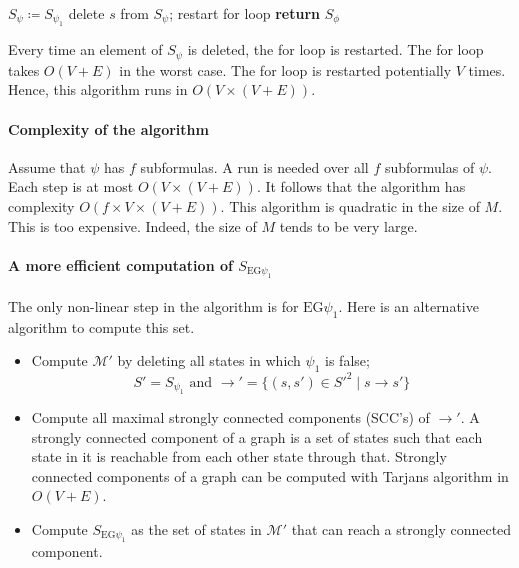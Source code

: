 \documentclass[10pt,a4paper]{article}
\theoremstyle{definition}
\begin{document}
\begin{itemize}
\begin{algorithm}
\begin{algorithmic}[1]
    \State $S_\psi \coloneqq S_{\psi_1}$
    	\State delete $s$ from $S_\psi$; restart for loop
    	\EndIf
    \EndFor
    \State \textbf{return} $S_\phi$
\end{algorithmic}
\end{algorithm}

	Every time an element of $S_\psi$ is deleted, the for loop is restarted. The for loop takes $O(V + E)$ in the worst case. The for loop is restarted potentially $V$ times. Hence, this algorithm runs in $O(V \times (V + E))$.
\end{itemize}


\paragraph{Complexity of the algorithm}
Assume that $\psi$ has $f$ subformulas. A run is needed over all $f$ subformulas of $\psi$. Each step is at most $O(V \times (V + E))$. It follows that the algorithm has complexity $O(f \times V \times (V + E))$. This algorithm is quadratic in the size of $M$. This is too expensive. Indeed, the size of $M$ tends to be very large.

\paragraph{A more efficient computation of $S_{\text{EG}\psi_1}$} The only non-linear step in the algorithm is for $\text{EG}\psi_1$. Here is an alternative algorithm to compute this set.

\begin{itemize}
	\item Compute $\mathcal{M}'$ by deleting all states in which $\psi_1$ is false; $$S' = S_{\psi_1}\text{ and }\rightarrow'=\{(s,s') \in {S'}^2 \mid s \rightarrow s'\}$$
	\item Compute all maximal strongly connected components (SCC’s) of $\rightarrow'$. A strongly connected component of a graph is a set of states such that each state in it is reachable from each other state through that. Strongly connected components of a graph can be computed with Tarjans algorithm in $O(V + E)$.
	\item Compute $S_{\text{EG}\psi_1}$ as the set of states in $\mathcal{M}'$ that can reach a strongly connected component.
\end{itemize}
\end{document}
